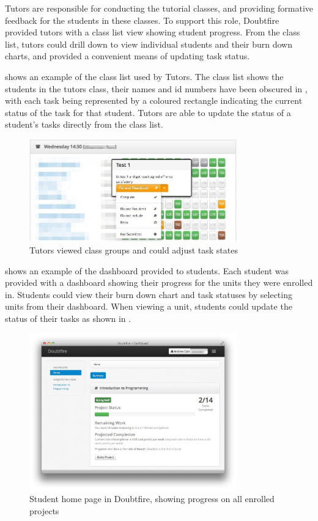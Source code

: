 Tutors are responsible for conducting the tutorial classes, and providing formative feedback for the students in these classes. To support this role, Doubtfire provided tutors with a class list view showing student progress. From the class list, tutors could drill down to view individual students and their burn down charts, and provided a convenient means of updating task status. 

 shows an example of the class list used by Tutors. The class list shows the students in the tutors class, their names and id numbers have been obscured in , with each task being represented by a coloured rectangle indicating the current status of the task for that student. Tutors are able to update the status of a student's tasks directly from the class list.

\begin{figure}[thbp]
  \centering
  \includegraphics[width=0.8\textwidth]{TutorView}
  \caption{Tutors viewed class groups and could adjust task states}
  \label{fig:tutor_view}
\end{figure}

 shows an example of the dashboard provided to students. Each student was provided with a dashboard showing their progress for the units they were enrolled in. Students could view their burn down chart and task statuses by selecting units from their dashboard. When viewing a unit, students could update the status of their tasks as shown in .

\begin{figure}[thbp]
  \centering
  \includegraphics[width=0.8\textwidth]{HomePage}%
  \caption{Student home page in Doubtfire, showing progress on all enrolled projects}%
  \label{fig:home_page}
\end{figure}

